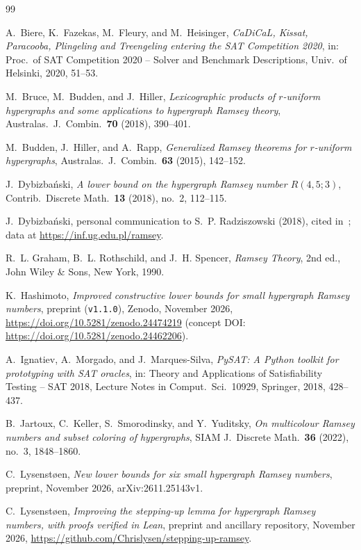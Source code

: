 \documentclass[11pt]{article}
\theoremstyle{remark}
\begin{document}
\begin{thebibliography}{99}
\small\raggedright

A.~Biere, K.~Fazekas, M.~Fleury, and M.~Heisinger,
\emph{CaDiCaL, Kissat, Paracooba, Plingeling and Treengeling entering the SAT
Competition 2020},
in: Proc.\ of SAT Competition 2020 -- Solver and Benchmark Descriptions,
Univ.\ of Helsinki, 2020, 51--53.

M.~Bruce, M.~Budden, and J.~Hiller,
\emph{Lexicographic products of $r$-uniform hypergraphs and some applications to
hypergraph Ramsey theory},
Australas.\ J.\ Combin.\ \textbf{70} (2018), 390--401.

M.~Budden, J.~Hiller, and A.~Rapp,
\emph{Generalized Ramsey theorems for $r$-uniform hypergraphs},
Australas.\ J.\ Combin.\ \textbf{63} (2015), 142--152.

J.~Dybizba\'nski,
\emph{A lower bound on the hypergraph Ramsey number $R(4,5;3)$},
Contrib.\ Discrete Math.\ \textbf{13} (2018), no.~2, 112--115.

J.~Dybizba\'nski,
personal communication to S.~P. Radziszowski (2018), cited in~\cite{survey};
data at \mbox{\url{https://inf.ug.edu.pl/ramsey}}.

R.~L. Graham, B.~L. Rothschild, and J.~H. Spencer,
\emph{Ramsey Theory}, 2nd ed., John Wiley \& Sons, New York, 1990.

K.~Hashimoto,
\emph{Improved constructive lower bounds for small hypergraph Ramsey numbers},
preprint (\texttt{v1.1.0}), Zenodo, November 2026,
\mbox{\url{https://doi.org/10.5281/zenodo.24474219}}
(concept DOI: \mbox{\url{https://doi.org/10.5281/zenodo.24462206}}).

A.~Ignatiev, A.~Morgado, and J.~Marques-Silva,
\emph{PySAT: A Python toolkit for prototyping with SAT oracles},
in: Theory and Applications of Satisfiability Testing -- SAT 2018,
Lecture Notes in Comput.\ Sci.\ 10929, Springer, 2018, 428--437.

B.~Jartoux, C.~Keller, S.~Smorodinsky, and Y.~Yuditsky,
\emph{On multicolour Ramsey numbers and subset coloring of hypergraphs},
SIAM J.\ Discrete Math.\ \textbf{36} (2022), no.~3, 1848--1860.

C.~Lysenst{\o}en,
\emph{New lower bounds for six small hypergraph Ramsey numbers},
preprint, November 2026, arXiv:2611.25143v1.

C.~Lysenst{\o}en,
\emph{Improving the stepping-up lemma for hypergraph Ramsey numbers, with proofs
verified in Lean},
preprint and ancillary repository, November 2026,
\mbox{\url{https://github.com/Chrislysen/stepping-up-ramsey}}.


\end{thebibliography}
\end{document}
